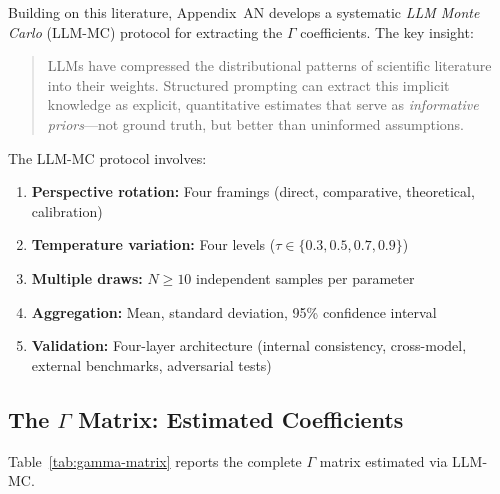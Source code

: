 Building on this literature, Appendix~AN develops a systematic \emph{LLM Monte Carlo} (LLM-MC)
protocol for extracting the $\Gamma$ coefficients. The key insight:

\begin{quote}
LLMs have compressed the distributional patterns of scientific literature into their weights.
Structured prompting can extract this implicit knowledge as explicit, quantitative estimates
that serve as \emph{informative priors}---not ground truth, but better than uninformed assumptions.
\end{quote}

The LLM-MC protocol involves:
\begin{enumerate}
  \item \textbf{Perspective rotation:} Four framings (direct, comparative, theoretical, calibration)
  \item \textbf{Temperature variation:} Four levels ($\tau \in \{0.3, 0.5, 0.7, 0.9\}$)
  \item \textbf{Multiple draws:} $N \geq 10$ independent samples per parameter
  \item \textbf{Aggregation:} Mean, standard deviation, 95\% confidence interval
  \item \textbf{Validation:} Four-layer architecture (internal consistency, cross-model, external benchmarks, adversarial tests)
\end{enumerate}

\subsection{The $\Gamma$ Matrix: Estimated Coefficients}

Table~\ref{tab:gamma-matrix} reports the complete $\Gamma$ matrix estimated via LLM-MC.

